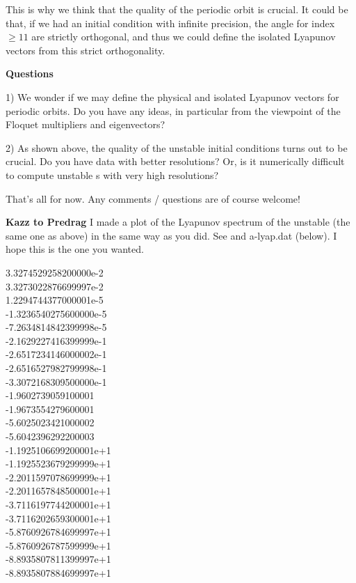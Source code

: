 \begin{description}
This is why we think that the quality of the periodic orbit is crucial.
It could be that, if we had an initial condition with infinite
precision, the angle for index $\geq 11$ are strictly orthogonal, and thus we
could define the isolated Lyapunov vectors from this strict orthogonality.


\textbf{Questions}

1) We wonder if we may define the physical and isolated Lyapunov vectors for
periodic orbits. Do you have any ideas, in particular from the viewpoint
of the Floquet multipliers and eigenvectors?

2) As shown above, the quality of the {unstable \po} initial conditions turns out
to be crucial. Do you have data with better resolutions? Or, is it
numerically difficult to compute {unstable \po}s with very high resolutions?

That's all for now. Any comments / questions are of course welcome!


\textbf{Kazz to Predrag} I made a plot of the Lyapunov spectrum of
the {unstable \po} (the same one as above) in the same way as you did. See 
and {\po}a-lyap.dat (below). I hope this is the one you wanted.

                            \noindent
 3.3274529258200000e-2    \\
 3.3273022876699997e-2    \\
 1.2294744377000001e-5    \\
 -1.3236540275600000e-5    \\
 -7.2634814842399998e-5    \\
 -2.1629227416399999e-1    \\
 -2.6517234146000002e-1    \\
 -2.6516527982799998e-1    \\
 -3.3072168309500000e-1    \\
 -1.9602739059100001    \\
 -1.9673554279600001    \\
 -5.6025023421000002    \\
 -5.6042396292200003    \\
 -1.1925106699200001e+1    \\
 -1.1925523679299999e+1    \\
 -2.2011597078699999e+1    \\
 -2.2011657848500001e+1    \\
 -3.7116197744200001e+1    \\
 -3.7116202659300001e+1    \\
 -5.8760926784699997e+1    \\
 -5.8760926787599999e+1    \\
 -8.8935807811399997e+1    \\
 -8.8935807884699997e+1    \\


\end{description}
